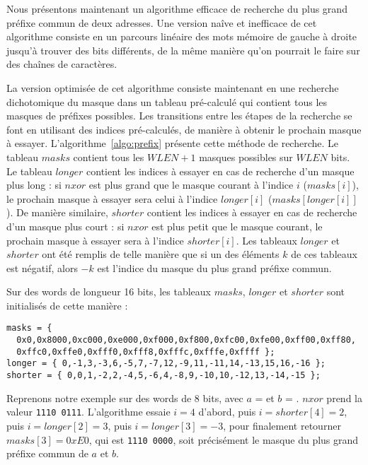 Nous présentons maintenant un algorithme efficace de recherche du plus grand
préfixe commun de deux adresses.
Une version naîve et inefficace de cet algorithme consiste en un parcours
linéaire des mots mémoire de gauche à droite jusqu'à trouver des bits
différents, de la même manière qu'on pourrait le faire sur des chaînes de
caractères.

La version optimisée de cet algorithme consiste maintenant en une recherche
dichotomique du masque dans un tableau pré-calculé qui contient tous les masques
de préfixes possibles.
Les transitions entre les étapes de la recherche se font en utilisant des
indices pré-calculés, de manière à obtenir le prochain masque à essayer.
L'algorithme~\ref{algo:prefix} présente cette méthode de recherche.
Le tableau $masks$ contient tous les $WLEN+1$ masques possibles sur
$WLEN$ bits.
Le tableau $longer$ contient les indices à essayer en cas de recherche d'un
masque plus long : si $nxor$ est plus grand que le masque courant à l'indice $i$
($masks[i]$), le prochain masque à essayer sera celui à l'indice $longer[i]$
($masks[longer[i]]$).
De manière similaire, $shorter$ contient les indices à essayer en cas de
recherche d'un masque plus court : si $nxor$ est plus petit que le masque
courant, le prochain masque à essayer sera à l'indice $shorter[i]$.
Les tableaux $longer$ et $shorter$ ont été remplis de telle manière que si un
des éléments $k$ de ces tableaux est négatif, alors $- k$ est l'indice du masque
du plus grand préfixe commun.

Sur des words de longueur 16 bits, les tableaux $masks$, $longer$ et $shorter$
sont initialisés de cette manière :

\begin{lstlisting}
masks = {
  0x0,0x8000,0xc000,0xe000,0xf000,0xf800,0xfc00,0xfe00,0xff00,0xff80,
  0xffc0,0xffe0,0xfff0,0xfff8,0xfffc,0xfffe,0xffff };
longer = { 0,-1,3,-3,6,-5,7,-7,12,-9,11,-11,14,-13,15,16,-16 };
shorter = { 0,0,1,-2,2,-4,5,-6,4,-8,9,-10,10,-12,13,-14,-15 };
\end{lstlisting}

Reprenons notre exemple sur des words de 8 bits, avec $a$ =
 et $b$ = .
$nxor$ prend la valeur \texttt{1110\,0111}.
L'algorithme essaie $i = 4$ d'abord, puis $i = shorter[4] = 2$, puis
$i = longer[2] = 3$, puis $i = longer[3] = -3$, pour finalement retourner
$masks[3] = 0xE0$, qui est \texttt{1110\,0000}, soit précisément le masque du
plus grand préfixe commun de $a$ et $b$.


